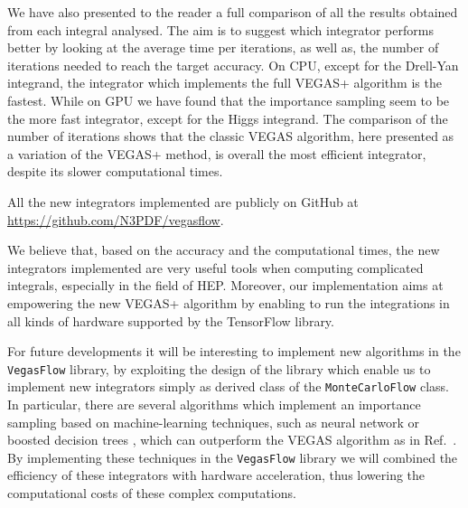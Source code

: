 \documentclass[../main/main.tex]{subfiles}
\begin{document}
We have also presented to the reader a full comparison of all the results obtained from each integral analysed. The aim is to suggest which integrator performs better by looking at the average time per iterations, as well as, the number of iterations needed to reach the target accuracy. On CPU, except for the Drell-Yan integrand, the integrator which implements the full VEGAS+ algorithm is the fastest. While on GPU we have found that the importance sampling seem to be the more fast integrator, except for the Higgs integrand.
The comparison of the number of iterations shows that the classic VEGAS algorithm, here presented as a variation of the VEGAS+ method, is overall the most efficient 
integrator, despite its slower computational times. 

All the new integrators implemented are publicly on GitHub at \url{https://github.com/N3PDF/vegasflow}.

We believe that, based on the accuracy and the computational times, the new integrators implemented are very useful tools when computing complicated integrals, especially in the field of HEP. Moreover, our implementation aims at empowering the new VEGAS+ algorithm by enabling to run the integrations in all kinds of hardware supported by the TensorFlow library.

For future developments it will be interesting to implement new algorithms in the \texttt{VegasFlow} library, by exploiting the design of the library which enable us to implement new integrators simply as derived class of the \texttt{MonteCarloFlow} class. In particular, there are several algorithms which implement an importance sampling based on machine-learning techniques, such as neural network or boosted decision trees \cite{Bendavid:2017zhk}, which can outperform the VEGAS algorithm as in Ref.~\cite{Gao:2020vdv}. 
By implementing these techniques in the \texttt{VegasFlow} library we will combined the efficiency of these integrators with hardware acceleration, thus lowering the computational costs of these complex computations.
\end{document}
